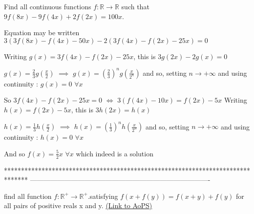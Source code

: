 \begin{solution}
	\begin{tcolorbox}Find all continuous functions $f: \mathbb{R}\to\mathbb{R}$ such that  $9f(8x)-9f(4x)+2f(2x)=100x$.\end{tcolorbox}
Equation may be written $3(3f(8x)-f(4x)-50x)-2(3f(4x)-f(2x)-25x)=0$

Writing $g(x)=3f(4x)-f(2x)-25x$, this is $3g(2x)-2g(x)=0$

$g(x)=\frac 23g(\frac x2)$ $\implies$ $g(x)=\left(\frac 23\right)^ng(\frac x{2^n})$ and so, setting $n\to+\infty$ and using continuity : $g(x)=0$ $\forall x$

So $3f(4x)-f(2x)-25x=0$ $\iff$ $3(f(4x)-10x)=f(2x)-5x$
Writing $h(x)=f(2x)-5x$, this is $3h(2x)=h(x)$

$h(x)=\frac 13h(\frac x2)$ $\implies$ $h(x)=\left(\frac 13\right)^nh(\frac x{2^n})$ and so, setting $n\to+\infty$ and using continuity : $h(x)=0$ $\forall x$

And so $\boxed{f(x)=\frac 52x}$ $\forall x$ which indeed is a solution
\end{solution}
*******************************************************************************
-------------------------------------------------------------------------------

\begin{problem}
	find all function $ f:\mathbb{R}^{+}\to\mathbb{R}^{+} $.satisfying $ f\left(x+f\left(y\right)\right) = f\left(x+y\right)+f\left(y\right) $  for all pairs of positive reals x and y.
	\flushright \href{https://artofproblemsolving.com/community/c6h563277}{(Link to AoPS)}
\end{problem}



